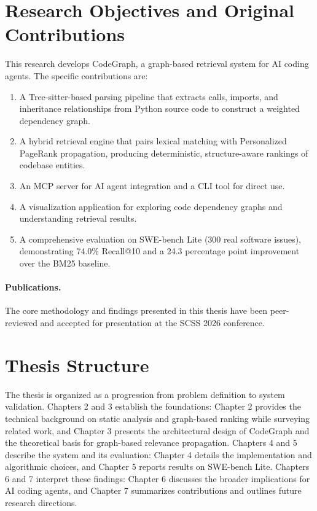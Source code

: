 \section{Research Objectives and Original Contributions}
\label{sec:objectives}

This research develops CodeGraph, a graph-based retrieval system for AI coding agents. The specific contributions are:

\begin{enumerate}
    \item A Tree-sitter-based parsing pipeline that extracts calls, imports, and inheritance relationships from Python source code to construct a weighted dependency graph.
    \item A hybrid retrieval engine that pairs lexical matching with Personalized PageRank propagation, producing deterministic, structure-aware rankings of codebase entities.
    \item An MCP server for AI agent integration and a CLI tool for direct use.
    \item A visualization application for exploring code dependency graphs and understanding retrieval results.
    \item A comprehensive evaluation on SWE-bench Lite (300 real software issues), demonstrating 74.0\% Recall@10 and a 24.3 percentage point improvement over the BM25 baseline.
\end{enumerate}

\paragraph{Publications.} The core methodology and findings presented in this thesis have been peer-reviewed and accepted for presentation at the SCSS 2026 conference.

\section{Thesis Structure}
\label{sec:roadmap}

The thesis is organized as a progression from problem definition to system validation. Chapters 2 and 3 establish the foundations: Chapter 2 provides the technical background on static analysis and graph-based ranking while surveying related work, and Chapter 3 presents the architectural design of CodeGraph and the theoretical basis for graph-based relevance propagation. Chapters 4 and 5 describe the system and its evaluation: Chapter 4 details the implementation and algorithmic choices, and Chapter 5 reports results on SWE-bench Lite. Chapters 6 and 7 interpret these findings: Chapter 6 discusses the broader implications for AI coding agents, and Chapter 7 summarizes contributions and outlines future research directions.

